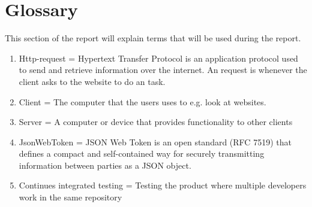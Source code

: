 \documentclass[paper=a4, fontsize=11pt,twoside]{scrartcl}	%
\begin{document}
\section{Glossary}
This section of the report will explain terms that will be used during the report. 
\begin{enumerate}
\item Http-request = Hypertext Transfer Protocol is an application protocol used to send and retrieve information over the internet. An request is whenever the client asks to the website to do an task.
\item Client = The computer that the users uses to e.g. look at websites.
\item Server = A computer or device that provides functionality to other clients
\item JsonWebToken = JSON Web Token is an open standard (RFC 7519) that defines a compact and self-contained way for securely transmitting information between parties as a JSON object.
\item Continues integrated testing = Testing the product where multiple developers work in the same repository
\end{enumerate}


\newpage
\end{document}

